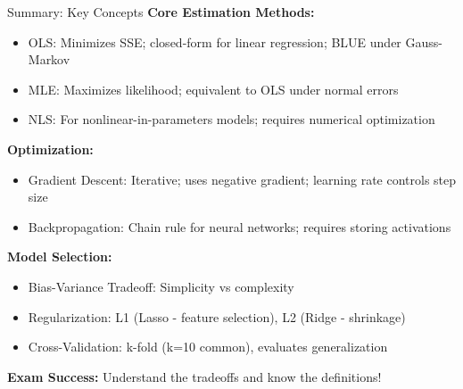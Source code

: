 \documentclass[8pt]{beamer}
\begin{document}
	\begin{frame}{Summary: Key Concepts}
		\fontsize{6.5}{7.5}\selectfont
		\textbf{Core Estimation Methods:}
		\begin{itemize}
			\item \textcolor{myblue}{OLS:} Minimizes SSE; closed-form for linear regression; BLUE under Gauss-Markov
			\item \textcolor{myblue}{MLE:} Maximizes likelihood; equivalent to OLS under normal errors
			\item \textcolor{myblue}{NLS:} For nonlinear-in-parameters models; requires numerical optimization
		\end{itemize}
		
		\vspace{0.1cm}
		\textbf{Optimization:}
		\begin{itemize}
			\item \textcolor{myblue}{Gradient Descent:} Iterative; uses negative gradient; learning rate controls step size
			\item \textcolor{myblue}{Backpropagation:} Chain rule for neural networks; requires storing activations
		\end{itemize}
		
		\vspace{0.1cm}
		\textbf{Model Selection:}
		\begin{itemize}
			\item \textcolor{myblue}{Bias-Variance Tradeoff:} Simplicity vs complexity
			\item \textcolor{myblue}{Regularization:} L1 (Lasso - feature selection), L2 (Ridge - shrinkage)
			\item \textcolor{myblue}{Cross-Validation:} k-fold (k=10 common), evaluates generalization
		\end{itemize}
		
		\textcolor{myred}{\textbf{Exam Success:}} Understand the tradeoffs and know the definitions!
	\end{frame}
	
\end{document}
